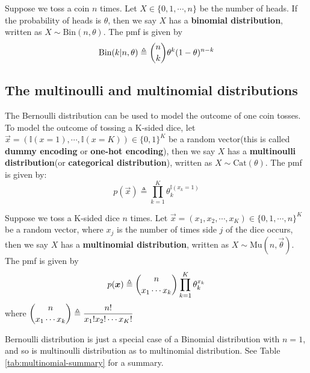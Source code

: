 \begin{definition}
Suppose we toss a coin $n$ times. Let $X \in \{0,1,\cdots,n\}$ be the number of heads. If the probability of heads is $\theta$, then we say $X$ has a \textbf{binomial distribution}, written as $X \sim \text{Bin}(n, \theta)$. The pmf is given by 
\begin{equation}\label{eqn:binomial-pmf}
\text{Bin}(k|n,\theta) \triangleq \dbinom{n}{k}\theta^k(1-\theta)^{n-k}
\end{equation}
\end{definition}


\subsection{The multinoulli and multinomial distributions}

\begin{definition}
The Bernoulli distribution can be used to model the outcome of one coin tosses. To model the outcome of tossing a K-sided dice, let $\vec{x} =(\mathbb{I}(x=1),\cdots,\mathbb{I}(x=K)) \in \{0,1\}^K$ be a random vector(this is called \textbf{dummy encoding} or \textbf{one-hot encoding}), then we say $X$ has a \textbf{multinoulli distribution}(or \textbf{categorical distribution}), written as $X \sim \text{Cat}(\theta)$. The pmf is given by: 
\begin{equation}
p(\vec{x}) \triangleq \prod\limits_{k=1}^K\theta_k^{\mathbb{I}(x_k=1)}
\end{equation}
\end{definition}

\begin{definition}
Suppose we toss a K-sided dice $n$ times. Let $\vec{x} =(x_1,x_2,\cdots,x_K) \in \{0,1,\cdots,n\}^K$ be a random vector, where $x_j$ is the number of times side $j$ of the dice occurs, then we say $X$ has a \textbf{multinomial distribution}, written as $X \sim \text{Mu}(n, \vec{\theta})$. The pmf is given by 
\begin{equation}\label{eqn:multinomial-pmf}
p(\vec{x}) \triangleq \dbinom{n}{x_1 \cdots x_k} \prod\limits_{k=1}^K\theta_k^{x_k}
\end{equation}
where $\dbinom{n}{x_1 \cdots x_k} \triangleq \dfrac{n!}{x_1!x_2! \cdots x_K!}$
\end{definition}

Bernoulli distribution is just a special case of a Binomial distribution with $n=1$, and so is multinoulli distribution as to multinomial distribution. See Table \ref{tab:multinomial-summary} for a summary.


